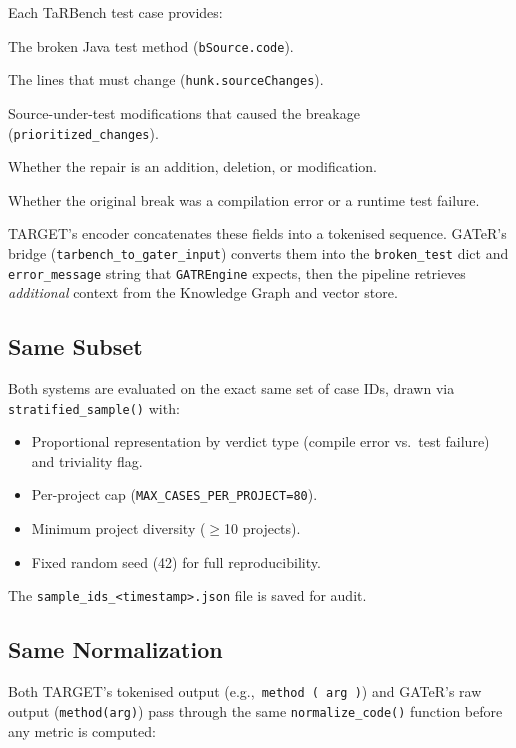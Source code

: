 \documentclass[11pt,a4paper]{article}
\begin{document}
Each TaRBench test case provides:
\begin{description}[style=nextline]
    \item[Test code] The broken Java test method (\texttt{bSource.code}).
    \item[Broken lines] The lines that must change (\texttt{hunk.sourceChanges}).
    \item[SUT changes] Source-under-test modifications that caused the
          breakage (\texttt{prioritized\_changes}).
    \item[Hunk type] Whether the repair is an addition, deletion, or
          modification.
    \item[Verdict] Whether the original break was a compilation error
          or a runtime test failure.
\end{description}

TARGET's encoder concatenates these fields into a tokenised sequence.
GATeR's bridge (\texttt{tarbench\_to\_gater\_input}) converts them into
the \texttt{broken\_test} dict and \texttt{error\_message} string that
\texttt{GATREngine} expects, then the pipeline retrieves \emph{additional}
context from the Knowledge Graph and vector store.

\subsection{Same Subset}

Both systems are evaluated on the exact same set of case IDs, drawn
via \texttt{stratified\_sample()} with:
\begin{itemize}
    \item Proportional representation by verdict type (compile error
          vs.\ test failure) and triviality flag.
    \item Per-project cap (\texttt{MAX\_CASES\_PER\_PROJECT=80}).
    \item Minimum project diversity ($\geq$10 projects).
    \item Fixed random seed (42) for full reproducibility.
\end{itemize}

The \texttt{sample\_ids\_<timestamp>.json} file is saved for audit.

\subsection{Same Normalization}

Both TARGET's tokenised output (e.g.,\ \texttt{method ( arg )}) and
GATeR's raw output (\texttt{method(arg)}) pass through the same
\texttt{normalize\_code()} function before any metric is computed:
\end{document}
